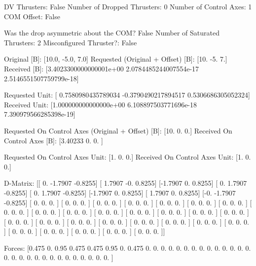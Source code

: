 DV Thrusters:	False
Number of Dropped Thrusters:	0
Number of Control Axes:	1
COM Offset:	False

Was the drop asymmetric about the COM?	False
Number of Saturated Thrusters:	2
Misconfigured Thruster?:	False

Original [B]:	[10.0, -5.0, 7.0]
Requested (Original + Offset) [B]:	[10. -5.  7.]
Received [B]:		[3.4023300000000001e+00 2.0784485244007554e-17 2.5146551507759799e-18]

Requested Unit:		[ 0.7580980435789034 -0.3790490217894517  0.5306686305052324]
Received Unit:		[1.000000000000000e+00 6.108897503771696e-18 7.390979566285398e-19]

Requested On Control Axes (Original + Offset) [B]:	[10.  0.  0.]
Received On Control Axes [B]:		[3.40233 0.      0.     ]

Requested On Control Axes Unit:		[1. 0. 0.]
Received On Control Axes Unit:		[1. 0. 0.]

D-Matrix:
[[ 0.     -1.7907 -0.8255]
 [ 1.7907 -0.      0.8255]
 [-1.7907  0.      0.8255]
 [ 0.      1.7907 -0.8255]
 [ 0.      1.7907 -0.8255]
 [-1.7907  0.      0.8255]
 [ 1.7907  0.      0.8255]
 [-0.     -1.7907 -0.8255]
 [ 0.      0.      0.    ]
 [ 0.      0.      0.    ]
 [ 0.      0.      0.    ]
 [ 0.      0.      0.    ]
 [ 0.      0.      0.    ]
 [ 0.      0.      0.    ]
 [ 0.      0.      0.    ]
 [ 0.      0.      0.    ]
 [ 0.      0.      0.    ]
 [ 0.      0.      0.    ]
 [ 0.      0.      0.    ]
 [ 0.      0.      0.    ]
 [ 0.      0.      0.    ]
 [ 0.      0.      0.    ]
 [ 0.      0.      0.    ]
 [ 0.      0.      0.    ]
 [ 0.      0.      0.    ]
 [ 0.      0.      0.    ]
 [ 0.      0.      0.    ]
 [ 0.      0.      0.    ]
 [ 0.      0.      0.    ]
 [ 0.      0.      0.    ]
 [ 0.      0.      0.    ]
 [ 0.      0.      0.    ]
 [ 0.      0.      0.    ]
 [ 0.      0.      0.    ]
 [ 0.      0.      0.    ]
 [ 0.      0.      0.    ]]

Forces:
[0.475 0.    0.95  0.475 0.475 0.95  0.    0.475 0.    0.    0.    0.
 0.    0.    0.    0.    0.    0.    0.    0.    0.    0.    0.    0.
 0.    0.    0.    0.    0.    0.    0.    0.    0.    0.    0.    0.   ]

